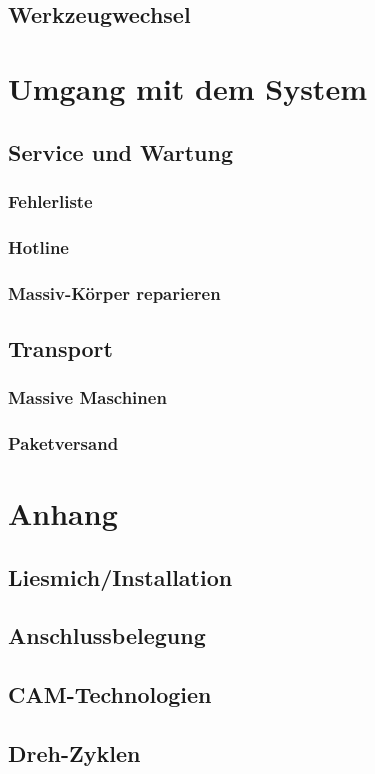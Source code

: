 \documentclass[14pt,a4paper]{book}
\begin{document}
	\section{Werkzeugwechsel} 

\chapter{Umgang mit dem System}
	\section{Service und Wartung} 
		\subsection{Fehlerliste} 
		\subsection{Hotline} 
		\subsection{Massiv-Körper reparieren} 
	\section{Transport} 
		\subsection{Massive Maschinen} 
		\subsection{Paketversand} 
 
\chapter{Anhang}
	\section{Liesmich/Installation} 
	\section{Anschlussbelegung} 
	\section{CAM-Technologien} 
	\section{Dreh-Zyklen} 
\end{document}
